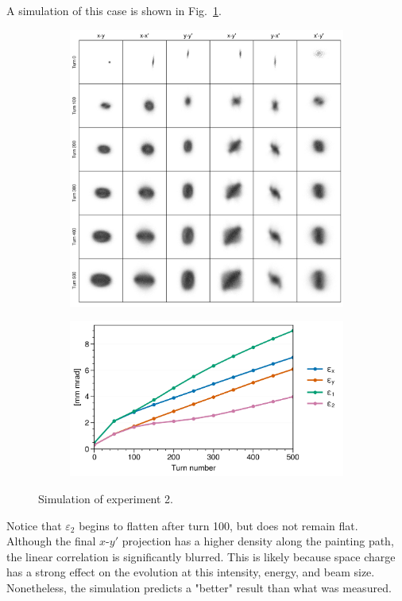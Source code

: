 A simulation of this case is shown in Fig.~\ref{fig:exp2_sim}.
%
\begin{figure}[!p]
    \centering
    \begin{subfigure}{0.85\textwidth}
        \includegraphics[width=\textwidth]{Images/chapter5/exp2/sim_snapshots.png}
    \end{subfigure}
    \vfill
    \vspace*{1.0cm}
    \vfill
    \begin{subfigure}{0.7\textwidth}
        \includegraphics[width=\textwidth]{Images/chapter5/exp2/sim_emittances.png}
    \end{subfigure}
    \caption{Simulation of experiment 2.}
    \label{fig:exp2_sim}
\end{figure}
%
Notice that $\varepsilon_2$ begins to flatten after turn 100, but does not remain flat. Although the final $x$-$y'$ projection has a higher density along the painting path, the linear correlation is significantly blurred. This is likely because space charge has a strong effect on the evolution at this intensity, energy, and beam size. Nonetheless, the simulation predicts a "better" result than what was measured.



